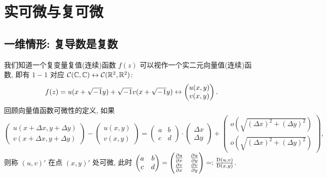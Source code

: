     \section{实可微与复可微}
        \subsection{一维情形: 复导数是复数}
            我们知道一个复变量复值(连续)函数 $f(z)$ 可以视作一个实二元向量值(连续)函数, 即有 $1-1$ 对应 $\mathcal{C}(\mathbb{C},\mathbb{C})\leftrightarrow\mathcal{C}(\mathbb{R}^2,\mathbb{R}^2)$:
            \begin{equation*}
                f(z) = u(x+\sqrt{-1} y)+\sqrt{-1} v(x+\sqrt{-1} y) \leftrightarrow \begin{pmatrix} u(x,y) \\ v(x,y) \end{pmatrix}.
            \end{equation*}
            回顾向量值函数可微性的定义, 如果
            \begin{equation}\label{R-differential}
                \begin{pmatrix}
                    u(x+\Delta x,y+\Delta y) \\ v(x+\Delta x,y+\Delta y)
                \end{pmatrix} - 
                \begin{pmatrix}
                    u(x,y) \\ v(x,y)
                \end{pmatrix} = 
                \begin{pmatrix}
                    a & b \\
                    c & d
                \end{pmatrix}\cdot
                \begin{pmatrix}
                    \Delta x \\ \Delta y 
                \end{pmatrix}+
                \begin{pmatrix}
                    o(\sqrt{(\Delta x)^2+(\Delta y)^2}) \\ o(\sqrt{(\Delta x)^2+(\Delta y)^2})
                \end{pmatrix},
            \end{equation}
            则称 $(u,v)'$ 在点 $(x,y)'$ 处可微, 
            此时 $\begin{pmatrix} a & b \\ c & d \end{pmatrix} = \begin{pmatrix} \frac{\partial u}{\partial x} & \frac{\partial u}{\partial y} \\ \frac{\partial v}{\partial x} & \frac{\partial v}{\partial y} \end{pmatrix}=:\frac{{\rm D}(u,v)}{{\rm D}(x,y)}$.

